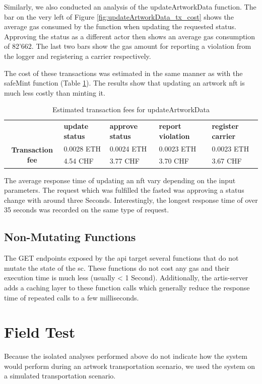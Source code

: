 Similarly, we also conducted an analysis of the updateArtworkData function. The bar on the very left of Figure \ref{fig:updateArtworkData_tx_cost} shows the average gas consumed by the function when updating the requested status. Approving the status as a different actor then shows an average gas consumption of 82'662. The last two bars show the gas amount for reporting a violation from the logger and registering a carrier respectively.

The cost of these transactions was estimated in the same manner as with the safeMint function (Table \ref{tab:updateArtworkData_tx_fees}). The results show that updating an artwork \gls{nft} is much less costly than minting it. 

\begin{table}[ht]
\begin{tabular}{cllll}
                                          & \textbf{update status} & \textbf{approve status} & \textbf{report violation} & \textbf{register carrier} \\ \cline{2-5} 
\multirow{2}{*}{\textbf{Transaction fee}} & 0.0028 ETH             & 0.0024 ETH          & 0.0023 ETH        & 0.0023 ETH       \\
                                          & 4.54 CHF               & 3.77 CHF            & 3.70 CHF          & 3.67 CHF       
\end{tabular}
\caption{Estimated transaction fees for updateArtworkData}
\label{tab:updateArtworkData_tx_fees}
\end{table}

The average response time of updating an \gls{nft} vary depending on the input parameters. The request which was fulfilled the fasted was approving a status change with around three Seconds. Interestingly, the longest response time of over 35 seconds was recorded on the same type of request.


\subsection*{Non-Mutating Functions}
The GET endpoints exposed by the \gls{api} target several functions that do not mutate the state of the \gls{sc}. These functions do not cost any gas and their execution time is much less (usually < 1 Second). Additionally, the artis-server adds a caching layer to these function calls which generally reduce the response time of repeated calls to a few milliseconds. 

\clearpage
\section{Field Test}
\label{sec:field_test}
Because the isolated analyses performed above do not indicate how the system would perform during an artwork transportation scenario, we used the system on a simulated transportation scenario.

